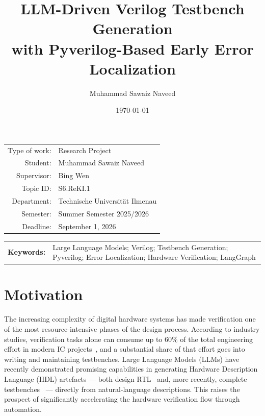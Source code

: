 \documentclass[11pt,a4paper, titlepage=false]{scrreprt}
\begin{document}
\title{LLM-Driven Verilog Testbench Generation\\with Pyverilog-Based Early Error Localization}
\author{Muhammad Sawaiz Naveed}
\date{\today}
\maketitle
\vspace{1cm}

\begin{tabular}{r l}
Type of work: & Research Project \\
Student:      & Muhammad Sawaiz Naveed \\
Supervisor:   & Bing Wen \\
Topic ID:     & S6.ReKI.1 \\
Department:   & Technische Universität Ilmenau \\
Semester:     & Summer Semester 2025/2026 \\
Deadline:     & September 1, 2026 \\
\end{tabular}

\vspace{3mm}

\begin{tabular}{l p{}}
\\
\textbf{Keywords:} & Large Language Models; Verilog; Testbench Generation; Pyverilog; Error Localization; Hardware Verification; LangGraph \\
\end{tabular}

\vspace{8mm}


\section*{Motivation}

The increasing complexity of digital hardware systems has made verification one of the most
resource-intensive phases of the design process. According to industry studies, verification
tasks alone can consume up to 60\% of the total engineering effort in modern IC
projects~\cite{wilson2022}, and a substantial share of that effort goes into writing and
maintaining testbenches. Large Language Models (LLMs) have recently demonstrated promising
capabilities in generating Hardware Description Language (HDL) artefacts --- both design
RTL~\cite{liu2023verilogeval,thakur2023autochip} and, more recently, complete
testbenches~\cite{qiu2024autobench} --- directly from natural-language descriptions. This
raises the prospect of significantly accelerating the hardware verification flow through
automation.
\end{document}

